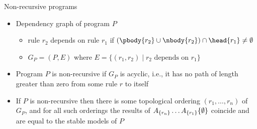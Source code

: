 \begin{frame}{Non-recursive programs}
  \begin{itemize}
    \item Dependency graph of program $P$
      \begin{itemize}
        \item rule $r_2$ depends on rule $r_1$
              if $(\pbody{r_2}\cup\nbody{r_2})\cap\head{r_1}\neq\emptyset$
        \item $G_P=(P,E)$ where $E=\{ (r_1,r_2) \mid r_2 \mbox{ depends on } r_1 \}$
      \end{itemize}
    \item Program $P$ is non-recursive if $G_P$ is acyclic, i.e., it has no path of length greater than zero
          from some rule $r$ to itself
    \item If $P$ is non-recursive then there is some topological ordering
          $(r_1, \ldots, r_n)$
          of $G_P$, and
          for all such orderings the results of
          $A_{\{r_n\}}\ldots A_{\{r_1\}}\{\emptyset\}$
          coincide and are equal to the stable models of $P$
  \end{itemize}
\end{frame}

